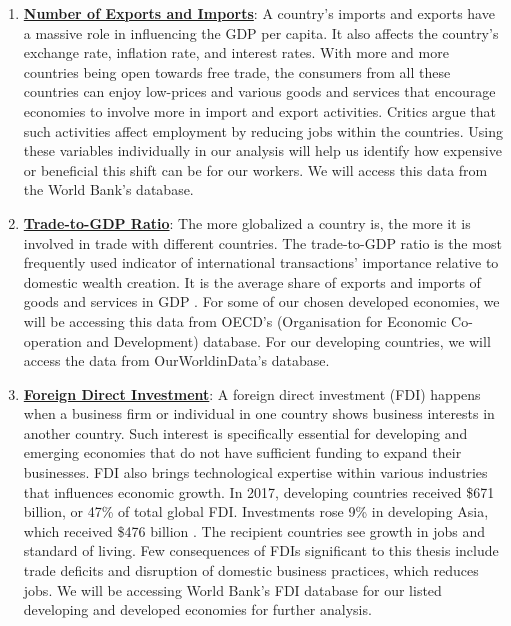 \documentclass[12pt,oneside]{book} %
\begin{document}
\begin{enumerate}

\item \underline{\textbf{Number of Exports and Imports}}: A country's imports and exports have a massive role in influencing the GDP per capita. It also affects the country's exchange rate, inflation rate, and interest rates. With more and more countries being open towards free trade, the consumers from all these countries can enjoy low-prices and various goods and services that encourage economies to involve more in import and export activities. Critics argue that such activities affect employment by reducing jobs within the countries. Using these variables individually in our analysis will help us identify how expensive or beneficial this shift can be for our workers. We will access this data from the World Bank's database.

\item \underline{\textbf{Trade-to-GDP Ratio}}: The more globalized a country is, the more it is involved in trade with different countries. The trade-to-GDP ratio is the most frequently used indicator of international transactions' importance relative to domestic wealth creation. It is the average share of exports and imports of goods and services in GDP \cite{organisation2010measuring}. For some of our chosen developed economies, we will be accessing this data from OECD's (Organisation for Economic Co-operation and Development) database. For our developing countries, we will access the data from OurWorldinData's database.

\item \underline{\textbf{Foreign Direct Investment}}: A foreign direct investment (FDI) happens when a business firm or individual in one country shows business interests in another country. Such interest is specifically essential for developing and emerging economies that do not have sufficient funding to expand their businesses. FDI also brings technological expertise within various industries that influences economic growth. In 2017, developing countries received \$671 billion, or 47\% of total global FDI. Investments rose 9\% in developing Asia, which received \$476 billion \cite{nachum2001united}. The recipient countries see growth in jobs and standard of living. Few consequences of FDIs significant to this thesis include trade deficits and disruption of domestic business practices, which reduces jobs. We will be accessing World Bank's FDI database for our listed developing and developed economies for further analysis.


\end{enumerate}
\end{document}
